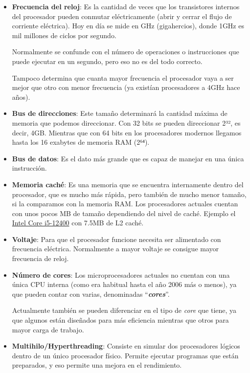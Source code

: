 \begin{itemize}
    \item \textbf{Frecuencia del reloj}: Es la cantidad de veces que los transistores internos del procesador pueden conmutar eléctricamente (abrir y cerrar el flujo de corriente eléctrica). Hoy en día se mide en GHz (gigahercios), donde 1GHz es mil millones de ciclos por segundo.

    Normalmente se confunde con el número de operaciones o instrucciones que puede ejecutar en un segundo, pero eso no es del todo correcto.

    Tampoco determina que cuanta mayor frecuencia el procesador vaya a ser mejor que otro con menor frecuencia (ya existían procesadores a 4GHz hace años).

    \item \textbf{Bus de direcciones}: Este tamaño determinará la cantidad máxima de memoria que podemos direccionar. Con 32 bits se pueden direccionar 2³², es decir, 4GB. Mientras que con 64 bits en los procesadores modernos llegamos hasta los 16 exabytes de memoria RAM (2⁶⁴).

    \item \textbf{Bus de datos}: Es el dato más grande que es capaz de manejar en una única instrucción.

    \item \textbf{Memoria caché}: Es una memoria que se encuentra internamente dentro del procesador, que es mucho más rápida, pero también de mucho menor tamaño, si la comparamos con la memoria RAM. Los procesadores actuales cuentan con unos pocos MB de tamaño dependiendo del nivel de caché. Ejemplo el \href{https://ark.intel.com/content/www/us/en/ark/products/134586/intel-core-i512400-processor-18m-cache-up-to-4-40-ghz.html}{Intel Core i5-12400} con 7.5MB de L2 caché.

    \item \textbf{Voltaje}: Para que el procesador funcione necesita ser alimentado con frecuencia eléctrica. Normalmente a mayor voltaje se consigue mayor frecuencia de reloj.

    \item \textbf{Número de cores}: Los microprocesadores actuales no cuentan con una única CPU interna (como era habitual hasta el año 2006 más o menos), ya que pueden contar con varias, denominadas “\textit{\textbf{cores}}”.

    Actualmente también se pueden diferenciar en el tipo de \textit{core} que tiene, ya que algunos están diseñados para más eficiencia mientras que otros para mayor carga de trabajo.

    \item \textbf{Multihilo/Hyperthreading}: Consiste en simular dos procesadores lógicos dentro de un único procesador físico. Permite ejecutar programas que están preparados, y eso permite una mejora en el rendimiento.
\end{itemize}


